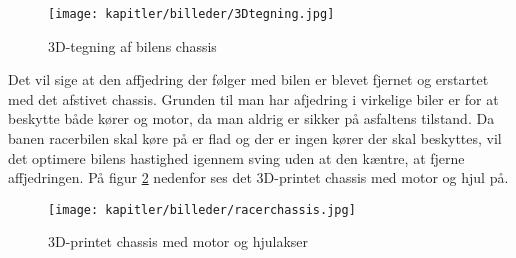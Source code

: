 \begin{figure}[ht]
    \centering
    \texttt{[image: kapitler/billeder/3Dtegning.jpg]}
    \caption{3D-tegning af bilens chassis}
    \label{fig:3Dtegning}
\end{figure}


Det vil sige at den affjedring der følger med bilen er blevet fjernet og erstartet med det afstivet chassis. Grunden til man har afjedring i virkelige biler er for at beskytte både kører og motor, da man aldrig er sikker på asfaltens tilstand. Da banen racerbilen skal køre på er flad og der er ingen kører der skal beskyttes, vil det optimere bilens hastighed igennem sving uden at den kæntre, at fjerne affjedringen. På figur \ref{fig:racerchassis} nedenfor ses det 3D-printet chassis med motor og hjul på.

\begin{figure}[ht]
    \centering
    \texttt{[image: kapitler/billeder/racerchassis.jpg]}
    \caption{3D-printet chassis med motor og hjulakser}
    \label{fig:racerchassis}
\end{figure}




